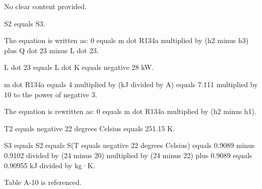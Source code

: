 No clear content provided.

S2 equals S3.  

The equation is written as:  
0 equals m dot R134a multiplied by (h2 minus h3) plus Q dot 23 minus L dot 23.  

L dot 23 equals L dot K equals negative 28 kW.  

m dot R134a equals 4 multiplied by (kJ divided by A) equals 7.111 multiplied by 10 to the power of negative 3.  

The equation is rewritten as:  
0 equals m dot R134a multiplied by (h2 minus h1).  

T2 equals negative 22 degrees Celsius equals 251.15 K.  

S3 equals S2 equals S(T equals negative 22 degrees Celsius) equals 0.9089 minus 0.9102 divided by (24 minus 20) multiplied by (24 minus 22) plus 0.9089 equals 0.90955 kJ divided by kg·K.  

Table A-10 is referenced.